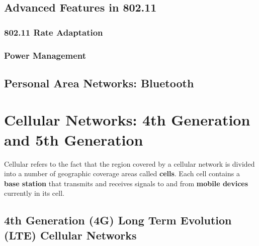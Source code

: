 \documentclass[12pt letter]{report}
\begin{document}
\section{Advanced Features in 802.11}

\subsection{802.11 Rate Adaptation}

\subsection{Power Management}

\section{Personal Area Networks: Bluetooth}

\chapter{Cellular Networks: 4th Generation and 5th Generation}

Cellular refers to the fact that the region covered by a cellular
network is divided into a number of geographic coverage areas called
\textbf{cells}. Each cell contains a \textbf{base station} that
transmits and receives signals to and from \textbf{mobile devices}
currently in its cell.

\section{4th Generation (4G) Long Term Evolution (LTE) Cellular Networks}
\end{document}
